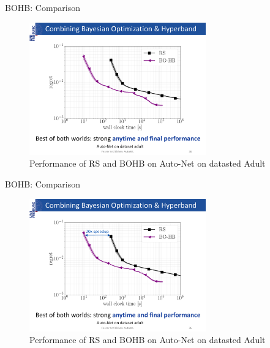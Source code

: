 \begin{frame}{BOHB: Comparison}
\begin{figure}
    \centering
    \includegraphics[width=0.68\textwidth]{w07_hpo_grey_box/images/bohb/BOHB_1.pdf}
    \caption{Performance of RS and BOHB on Auto-Net on datasted Adult}
\end{figure}

\end{frame}
\begin{frame}{BOHB: Comparison}
\begin{figure}
    \centering
    \includegraphics[width=0.68\textwidth]{w07_hpo_grey_box/images/bohb/BOHB_2.pdf}
    \caption{Performance of RS and BOHB on Auto-Net on datasted Adult}
\end{figure}

\end{frame}
